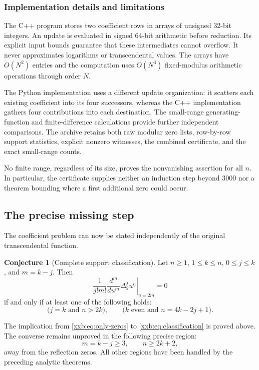 \documentclass[11pt,a4paper]{article}
\numberwithin{equation}{section}
\theoremstyle{definition}
\newtheorem{conjecture}[theorem]{Conjecture}
\theoremstyle{remark}
\theoremstyle{plain}
\newcommand{\fall}[2]{#1^{\underline{#2}}}
\begin{document}
\subsubsection{Implementation details and limitations}
The C++ program stores two coefficient rows in arrays of unsigned
32-bit integers. An update is evaluated in signed 64-bit arithmetic
before reduction. Its explicit input bounds guarantee that these
intermediates cannot overflow. It never approximates logarithms or
transcendental values. The arrays have $O(N^2)$ entries and the computation
uses $O(N^3)$ fixed-modulus arithmetic operations through order $N$.

The Python implementation uses a different update organization: it
scatters each existing coefficient into its four successors, whereas
the C++ implementation gathers four contributions into each destination.
The small-range generating-function and finite-difference calculations
provide further independent comparisons. The archive retains both raw
modular zero lists, row-by-row support statistics, explicit nonzero
witnesses, the combined certificate, and the exact small-range counts.

No finite range, regardless of its size, proves the nonvanishing assertion
for all $n$. In particular, the certificate supplies neither an induction
step beyond $3000$ nor a theorem bounding where a first additional zero
could occur.

\subsection{The precise missing step}\label{xxb:sec:remaining}
The coefficient problem can now be stated independently of the original
transcendental function.
\begin{conjecture}[Complete support classification]\label{xxb:conj:support}
Let $n\ge1$, $1\le k\le n$, $0\le j\le k$, and $m=k-j$. Then
\begin{equation}\label{xxb:eq:classification}
 \frac{1}{j!m!}
 \left.\frac{d^m}{du^m}\Delta_2^j\fall{u}{n}\right|_{u=2m}=0
\end{equation}
if and only if at least one of the following holds:
\begin{equation}\label{xxb:eq:only-zeros}
 \bigl(j=k\text{ and }n>2k\bigr),
 \qquad
 \bigl(k\text{ even and }n=4k-2j+1\bigr).
\end{equation}
\end{conjecture}
The implication from \eqref{xxb:eq:only-zeros} to \eqref{xxb:eq:classification}
is proved above. The converse remains unproved in the following precise
region:
\begin{equation}\label{xxb:eq:gap-region}
 m=k-j\ge3,\qquad n\ge2k+2,
\end{equation}
away from the reflection zeros. All other regions have been handled by
the preceding analytic theorems.
\end{document}
